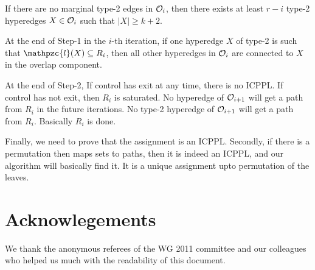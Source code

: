 \documentclass[11pt,letter]{../lib/llncs}
\def\cO{{\cal O}}
\def\cl{\mathpzc{l}}
\begin{document}
\begin{lemma}
  If there are no marginal type-2 edges in $\cO_i$, then there exists at least $r-i$ type-2 hyperedges $X \in \cO_i$ such that $|X| \geq k+2$.
\end{lemma}
\begin{lemma}
At the end of Step-1 in the $i$-th iteration, if one hyperedge $X$ of type-2 is such that $\cl(X) \subseteq R_i$, then all other hyperedges in $\cO_i$ are connected to $X$ in the overlap component.
\end{lemma}
\begin{lemma}
At the end of Step-2, If control has exit at any time, there is no ICPPL. If control has not exit, then $R_i$ is saturated.  No hyperedge of $\cO_{i+1}$ will get a path from $R_i$ in 
the future iterations.  No type-2 hyperedge of $\cO_{i+1}$ will get a path from $R_i$.
Basically $R_i$ is done.
\end{lemma}
\begin{lemma}
Finally, we need to prove that the assignment is an ICPPL. Secondly, if there is a permutation then maps sets to paths, then it is indeed an ICPPL, and our algorithm will basically 
find it.  It is a unique assignment upto permutation of the leaves.
\end{lemma}





\section {Acknowlegements} 
We thank the anonymous referees of the WG 2011 committee and our
colleagues who helped us much with the readability of this document.

% 

\end{document}
